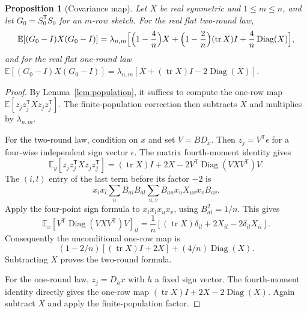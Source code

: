 \documentclass[11pt,a4paper]{article}
\newtheorem{proposition}[theorem]{Proposition}
\theoremstyle{definition}
\theoremstyle{remark}
\numberwithin{equation}{section}
\newcommand{\E}{\mathbb E}
\newcommand{\tr}{\operatorname{tr}}
\newcommand{\Diag}{\operatorname{Diag}}
\begin{document}
\begin{proposition}[Covariance map]\label{prop:covmap}
Let $X$ be real symmetric and $1\le m\le n$, and let $G_0=S_0^{\mathsf T}S_0$ for
an $m$-row sketch. For the real flat two-round law,
\[
 \E[(G_0-I)X(G_0-I)]=\lambda_{n,m}\Bigl[\Bigl(1-\frac4n\Bigr)X
 +\Bigl(1-\frac2n\Bigr)(\tr X)I+\frac4n\Diag(X)\Bigr],
\]
and for the real flat one-round law
$\E[(G_0-I)X(G_0-I)]=\lambda_{n,m}[X+(\tr X)I-2\Diag(X)]$.
\end{proposition}
\begin{proof}

By Lemma~\ref{lem:population}, it suffices to compute the one-row map
$\E[z_jz_j^{\mathsf T}Xz_jz_j^{\mathsf T}]$. The finite-population correction
then subtracts $X$ and multiplies by $\lambda_{n,m}$.

For the two-round law, condition on $x$ and set $V=BD_x$.
Then $z_j=V^{\mathsf T}\epsilon$ for a four-wise independent sign vector
$\epsilon$. The matrix fourth-moment identity gives
\[
 \E_y[z_jz_j^{\mathsf T}Xz_jz_j^{\mathsf T}]
 = (\tr X)I+2X-2V^{\mathsf T}\Diag(VXV^{\mathsf T})V.
\]
The $(i,l)$ entry of the last term before its factor $-2$ is
\[
 x_ix_l\sum_aB_{ai}B_{al}
               \sum_{u,v}B_{au}x_uX_{uv}x_vB_{av}.
\]
Apply the four-point sign formula to $x_ix_lx_ux_v$, using
$B_{ai}^2=1/n$. This gives
\[
 \E_x[V^{\mathsf T}\Diag(VXV^{\mathsf T})V]_{il}
 =\frac1n\left[(\tr X)\delta_{il}+2X_{il}-2\delta_{il}X_{ii}\right].
\]
Consequently the unconditional one-row map is
\[
 (1-2/n)[(\tr X)I+2X]+(4/n)\Diag(X).
\]
Subtracting $X$ proves the two-round formula.

For the one-round law, $z_j=D_hx$ with $h$ a fixed sign vector.
The fourth-moment identity directly gives the one-row map
$(\tr X)I+2X-2\Diag(X)$. Again subtract $X$ and apply the
finite-population factor.

\end{proof}
\end{document}
